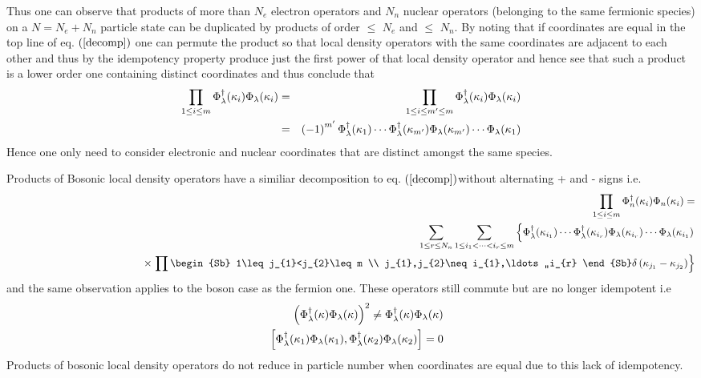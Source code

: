 Thus one can observe that products of more than $N_{e}$ electron operators
and $N_{n}$ nuclear operators (belonging to the same fermionic species) on a 
$N=N_{e}+N_{n}$ particle state can be duplicated by products of order $\leq $
$N_{e}$ and $\leq $ $N_{n}$. By noting that if coordinates are equal in the
top line of eq. $\left( \ref{decomp}\right) $ one can permute the product so
that local density operators with the same coordinates are adjacent to each
other and thus by the idempotency property produce just the first power of
that local density operator and hence see that such a product is a lower
order one containing distinct coordinates and thus conclude that 
\begin{eqnarray}
\prod_{1\leq i\leq m}\Phi _{{\cal \lambda }}^{\dagger }(\kappa _{i})\Phi _{%
{\cal \lambda }}(\kappa _{i}) &=&\prod_{1\leq i\leq m^{\prime }\leq m}\Phi _{%
{\cal \lambda }}^{\dagger }(\kappa _{i})\Phi _{{\cal \lambda }}(\kappa _{i})
\nonumber \\
&=&\left( -1\right) ^{m^{\prime }}\Phi _{{\cal \lambda }}^{\dagger }(\kappa
_{1})\cdots \Phi _{{\cal \lambda }}^{\dagger }(\kappa _{m^{\prime }})\Phi _{%
{\cal \lambda }}(\kappa _{m^{\prime }})\cdots \Phi _{{\cal \lambda }}(\kappa
_{1})
\end{eqnarray}%
Hence one only need to consider electronic and nuclear coordinates that are
distinct amongst the same species.

Products of Bosonic local density operators have a similiar decomposition to
eq. $\left( \ref{decomp}\right) $without alternating + and - signs i.e. 
\begin{eqnarray}
&&\prod_{1\leq i\leq m}\Phi _{n}^{\dagger }(\kappa _{i})\Phi _{n}(\kappa
_{i})= \\
&&\sum_{1\leq r\leq N_{n}}\sum_{1\leq i_{1}<\cdots <i_{r}\leq m}\left\{ \Phi
_{{\cal \lambda }}^{\dagger }(\kappa _{i_{1}})\cdots \Phi _{{\cal \lambda }%
}^{\dagger }(\kappa _{i_{r}})\Phi _{{\cal \lambda }}(\kappa _{i_{r}})\cdots
\Phi _{{\cal \lambda }}(\kappa _{i_{1}})\right. \\
&&\qquad \qquad \qquad \qquad \qquad \qquad \times \left. \prod\begin{Sb} %
1\leq j_{1}<j_{2}\leq m  \\ j_{1},j_{2}\neq i_{1},\ldots ,,i_{r}  \end{Sb} 
\delta \left( \kappa _{j_{1}}-\kappa _{j_{2}}\right) \right\}
\end{eqnarray}%
and the same observation applies to the boson case as the fermion one. These
operators still commute but are no longer idempotent i.e 
\begin{eqnarray}
&&\left( \Phi _{\lambda }^{\dagger }(\kappa )\Phi _{\lambda }(\kappa
)\right) ^{2}\neq \Phi _{\lambda }^{\dagger }(\kappa )\Phi _{\lambda
}(\kappa )  \nonumber \\
&&\left[ \Phi _{{\cal \lambda }}^{\dagger }(\kappa _{1})\Phi _{{\cal \lambda 
}}(\kappa _{1}),\Phi _{{\cal \lambda }}^{\dagger }(\kappa _{2})\Phi _{{\cal %
\lambda }}(\kappa _{2})\right] =0
\end{eqnarray}%
Products of bosonic local density operators do not reduce in particle number
when coordinates are equal due to this lack of idempotency.

